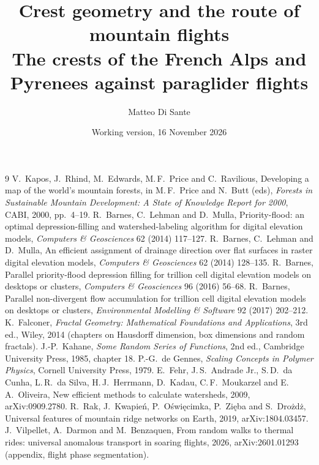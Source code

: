 \documentclass[11pt,a4paper]{article}
\title{\vspace{-1.8cm}\textbf{Crest geometry and the route of mountain flights}\\[3pt]
  \large The crests of the French Alps and Pyrenees against paraglider flights}
\author{Matteo Di Sante}
\date{Working version, 16 November 2026\vspace{-0.6cm}}
\begin{document}
\maketitle





\appendix



\begin{thebibliography}{9}
 V.\ Kapos, J.\ Rhind, M.\ Edwards, M.\,F.\ Price and C.\ Ravilious, Developing a map of the world's mountain forests, in M.\,F.\ Price and N.\ Butt (eds), \emph{Forests in Sustainable Mountain Development: A State of Knowledge Report for 2000}, CABI, 2000, pp.\ 4--19.
 R.\ Barnes, C.\ Lehman and D.\ Mulla, Priority-flood: an optimal depression-filling and watershed-labeling algorithm for digital elevation models, \emph{Computers \& Geosciences} 62 (2014) 117--127.
 R.\ Barnes, C.\ Lehman and D.\ Mulla, An efficient assignment of drainage direction over flat surfaces in raster digital elevation models, \emph{Computers \& Geosciences} 62 (2014) 128--135.
 R.\ Barnes, Parallel priority-flood depression filling for trillion cell digital elevation models on desktops or clusters, \emph{Computers \& Geosciences} 96 (2016) 56--68.
 R.\ Barnes, Parallel non-divergent flow accumulation for trillion cell digital elevation models on desktops or clusters, \emph{Environmental Modelling \& Software} 92 (2017) 202--212.
 K.\ Falconer, \emph{Fractal Geometry: Mathematical Foundations and Applications}, 3rd ed., Wiley, 2014 (chapters on Hausdorff dimension, box dimensions and random fractals).
 J.-P.\ Kahane, \emph{Some Random Series of Functions}, 2nd ed., Cambridge University Press, 1985, chapter 18.
 P.-G.\ de Gennes, \emph{Scaling Concepts in Polymer Physics}, Cornell University Press, 1979.
 E.\ Fehr, J.\,S.\ Andrade Jr., S.\,D.\ da Cunha, L.\,R.\ da Silva, H.\,J.\ Herrmann, D.\ Kadau, C.\,F.\ Moukarzel and E.\,A.\ Oliveira, New efficient methods to calculate watersheds, 2009, arXiv:0909.2780.
 R.\ Rak, J.\ Kwapie\'n, P.\ O\'swi\k{e}cimka, P.\ Zi\k{e}ba and S.\ Dro\.zd\.z, Universal features of mountain ridge networks on Earth, 2019, arXiv:1804.03457.
 J.\ Vilpellet, A.\ Darmon and M.\ Benzaquen, From random walks to thermal rides: universal anomalous transport in soaring flights, 2026, arXiv:2601.01293 (appendix, flight phase segmentation).
\end{thebibliography}
\end{document}
